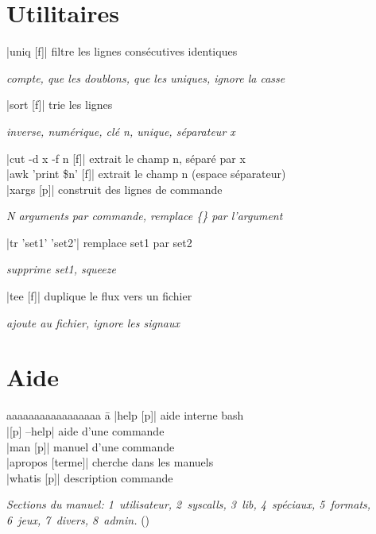 \documentclass{article}
\newenvironment{cmdblock}{%
  \par\setlength{\parindent}{0pt}\setlength{\parskip}{0pt}%
  \RaggedRight%
}{\par}
\newlength{\cmdoptindent}
\newcommand{\cmdopt}[1]{%
  \hspace*{\cmdoptindent}%
  \begin{minipage}[t]{\dimexpr\linewidth-\cmdoptindent\relax}
    \RaggedRight \itshape #1%
  \end{minipage}\par
}
\begin{document}
\begin{multicols}{4}
    \section*{Utilitaires}
    \begin{cmdblock}
        \code|uniq [f]| \quad filtre les lignes consécutives identiques \\
        \cmdopt{ compte,  que les doublons,
            \codx{-u} que les uniques, \codx{-i} ignore la casse}
        \code|sort [f]| \quad trie les lignes \\
        \cmdopt{ inverse,  numérique,
            \codx{-k n} clé n, \codx{-u} unique,
            \codx{-t x} séparateur x}
        \code|cut -d x -f n [f]| \quad extrait le champ n, séparé par x \\
        \code|awk '{print \$n}' [f]| \quad extrait le champ n (espace séparateur) \\
        \code|xargs [p]| \quad construit des lignes de commande \\
        \cmdopt{ N arguments par commande,
            \codx{-I \{\}} remplace \{\} par l'argument}
        \code|tr 'set1' 'set2'| \quad remplace set1 par set2 \\
        \cmdopt{ supprime set1,  squeeze}
        \code|tee [f]| \quad duplique le flux vers un fichier \\
        \cmdopt{ ajoute au fichier,  ignore les signaux}
    \end{cmdblock}

    \section*{Aide}
    \begin{tabbing}
        aaaaaaaaaaaaaaaaa \= a \kill
        \code|help [p]| \> aide interne bash \\
        \code|[p] --help| \> aide d'une commande \\
        \code|man [p]| \> manuel d'une commande \\
        \code|apropos [terme]| \> cherche dans les manuels \\
        \code|whatis [p]| \> description commande
    \end{tabbing}

    \emph{Sections du manuel: 1~utilisateur, 2~syscalls, 3~lib, 4~spéciaux, 5~formats, 6~jeux, 7~divers, 8~admin.} ()


\end{multicols}
\end{document}
